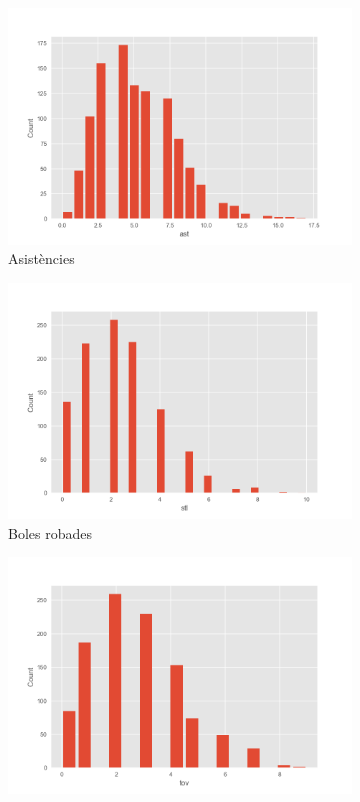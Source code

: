 \documentclass{article}
\begin{document}
\begin{figure}[!h]
	\centering
	\begin{subfigure}[b]{0.25\textwidth}
		\centering
		\includegraphics[width=\textwidth]{hist19}
		\caption*{Asistències}
		\label{fig:hist19}
	\end{subfigure}
	\hfill
	\begin{subfigure}[b]{0.25\textwidth}
		\centering
		\includegraphics[width=\textwidth]{hist20}
		\caption*{Boles robades}
		\label{fig:hist20}
	\end{subfigure}
	\hfill
	\begin{subfigure}[b]{0.25\textwidth}
		\centering
		\includegraphics[width=\textwidth]{hist22}

\end{subfigure}
\end{figure}
\end{document}
